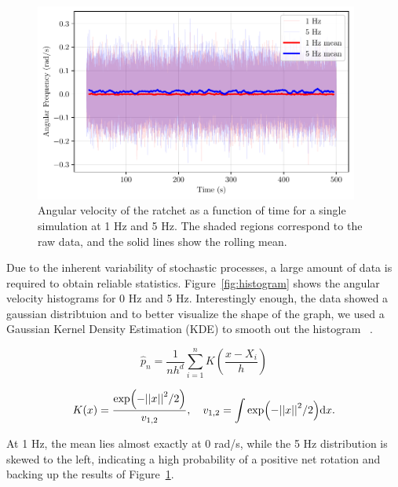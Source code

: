 \begin{figure}[h!]
\begin{center}
\includegraphics[width=0.95\textwidth]{figures/time_series.pdf}
\end{center}
\caption[Angular frequency as a function of time.]
{Angular velocity of the ratchet as a function of time for a single simulation at 1 Hz and 5 Hz. The shaded regions correspond to the raw data, and the solid lines show the rolling mean.}
\label{fig:velocityvstime}
\end{figure}

Due to the inherent variability of stochastic processes, a large amount of data is required to obtain reliable statistics. Figure~\ref{fig:histogram} shows the angular velocity histograms for 0 Hz and 5 Hz. Interestingly enough, the data showed a gaussian distribtuion and to better visualize the shape of the graph, we used a Gaussian Kernel Density Estimation (KDE) to smooth out the histogram ~\cite{chen2017tutorial}. 

\begin{equation}
  \hat{p}_n = \frac{1}{nh^d} \displaystyle\sum_{i=1}^{n}K \left(\frac{x - X_i}{h}\right)
  \label{eq:kde}
\end{equation}

\begin{equation}
  K(x) = \frac{\exp(-\abs{\abs{x}}^2/2)}{v_{1,2}}, \quad v_{1,2} = \displaystyle\int \exp(-\abs{\abs{x}}^2/2)\dd x.
  \label{eq:gaussiankernel}
\end{equation}

At 1 Hz, the mean lies almost exactly at 0 rad/s, while the 5 Hz distribution is skewed to the left, indicating a high probability of a positive net rotation and backing up the results of Figure~\ref{fig:velocityvstime}. 


